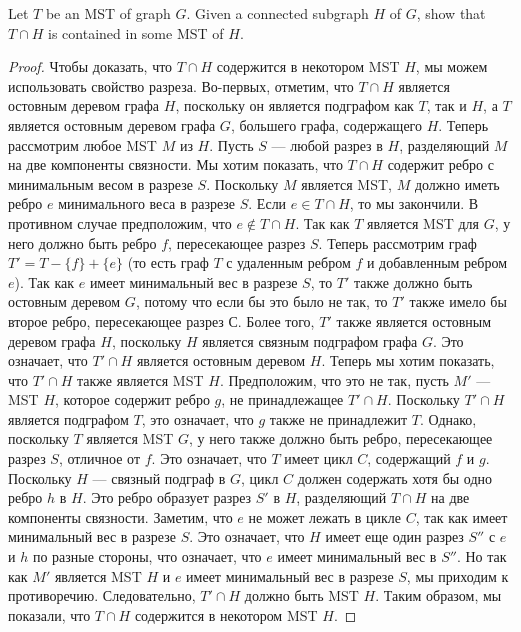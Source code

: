 \begin{prob}
Let $T$ be an MST of graph $G$. Given a connected subgraph $H$ of $G$, show that $T \cap H$ is contained in some MST of $H$.
\end{prob}
\vskip 0.2in
\begin{proof}
Чтобы доказать, что $T \cap H$ содержится в некотором MST $H$, мы можем использовать свойство разреза.
Во-первых, отметим, что $T \cap H$ является остовным деревом графа $H$, поскольку он является подграфом как $T$, так и $H$, а $T$ является остовным деревом графа $G$, большего графа, содержащего $H$. Теперь рассмотрим любое MST $M$ из $H$. Пусть $S$ — любой разрез в $H$, разделяющий $M$ на две компоненты связности. Мы хотим показать, что $T \cap H$ содержит ребро с минимальным весом в разрезе $S$. Поскольку $M$ является MST, $M$ должно иметь ребро $e$ минимального веса в разрезе $S$. Если $e \in T \cap H$, то мы закончили.
В противном случае предположим, что $e \notin T \cap H$. Так как $T$ является MST для $G$, у него должно быть ребро $f$, пересекающее разрез $S$. Теперь рассмотрим граф $T' = T - \{f\} + \{e\}$ (то есть граф $T$ с удаленным ребром $f$ и добавленным ребром $e$). Так как $e$ имеет минимальный вес в разрезе $S$, то $T'$ также должно быть остовным деревом $G$, потому что если бы это было не так, то $T'$ также имело бы второе ребро, пересекающее разрез $С$. Более того, $T'$ также является остовным деревом графа $H$, поскольку $H$ является связным подграфом графа $G$. Это означает, что $T' \cap H$ является остовным деревом $H$. Теперь мы хотим показать, что $T' \cap H$ также является MST $H$. Предположим, что это не так, пусть $M'$ — MST $H$, которое содержит ребро $g$, не принадлежащее $T' \cap H$. Поскольку $T' \cap H$ является подграфом $T$, это означает, что $g$ также не принадлежит $T$. Однако, поскольку $T$ является MST $G$, у него также должно быть ребро, пересекающее разрез $S$, отличное от $f$. Это означает, что $T$ имеет цикл $C$, содержащий $f$ и $g$. Поскольку $H$ — связный подграф в $G$, цикл $C$ должен содержать хотя бы одно ребро $h$ в $H$. Это ребро образует разрез $S'$ в $H$, разделяющий $T \cap H$ на две компоненты связности. Заметим, что $e$ не может лежать в цикле $C$, так как имеет минимальный вес в разрезе $S$. Это означает, что $H$ имеет еще один разрез $S''$ с $e$ и $h$ по разные стороны, что означает, что $e$ имеет минимальный вес в $S''$. Но так как $M'$ является MST $H$ и $e$ имеет минимальный вес в разрезе $S$, мы приходим к противоречию. Следовательно, $T' \cap H$ должно быть MST $H$. Таким образом, мы показали, что $T \cap H$ содержится в некотором MST $H$.
\end{proof}
\vskip 0.6in


